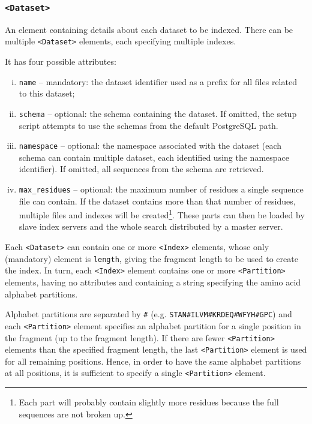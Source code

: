 \documentclass[10pt,letter]{article}
\begin{document}
\subsubsection*{\texttt{<Dataset>}}

An element containing details about each dataset to be indexed. There can be multiple \texttt{<Dataset>} elements, each specifying multiple indexes.

It has four possible attributes:
\begin{enumerate}[(i)]
\item \texttt{name} -- mandatory: the dataset identifier used as a prefix for all files related to this dataset;
\item \texttt{schema} -- optional: the schema containing the dataset. If omitted, the setup script attempts to use the schemas from the default PostgreSQL path.
\item \texttt{namespace} -- optional: the namespace associated with the dataset (each schema can contain multiple dataset, each identified using the namespace identifier). If omitted, all sequences from the schema are retrieved.
\item \texttt{max\_residues} -- optional: the maximum number of residues a single sequence file can contain. If the dataset contains more than that number of residues, multiple files and indexes will be created\footnote{Each part will probably contain slightly more residues because the full sequences are not broken up.}. These parts can then be loaded by slave index servers and the whole search distributed by a master server.
\end{enumerate}

Each \texttt{<Dataset>} can contain one or more \texttt{<Index>} elements, whose only (mandatory) element is \texttt{length}, giving the fragment length to be used to create the index. In turn, each \texttt{<Index>} element contains one or more \texttt{<Partition>} elements, having no attributes and containing a string specifying the amino acid alphabet partitions.

Alphabet partitions are separated by \texttt{\#} (e.g. \texttt{STAN\#ILVM\#KRDEQ\#WFYH\#GPC}) and each \texttt{<Partition>} element specifies an alphabet partition for a single position in the fragment (up to the fragment length). If there are fewer \texttt{<Partition>} elements than the specified fragment length, the last \texttt{<Partition>} element is used for all remaining positions. Hence, in order to have the same alphabet partitions at all positions, it is sufficient to specify a single \texttt{<Partition>} element.
\end{document}
